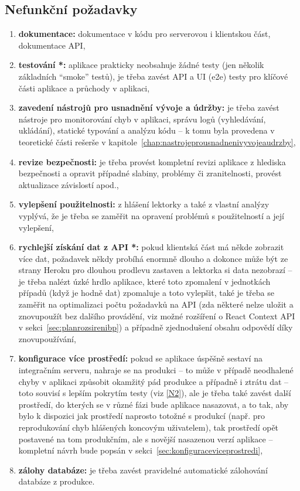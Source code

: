 \subsection{Nefunkční požadavky}

\begin{enumerate}[label=\textbf{N\arabic*}]
    \item \label{N1} \textbf{dokumentace:} dokumentace v kódu pro serverovou i klientskou část, dokumentace API,
    \item \label{N2} \textbf{testování *:} aplikace prakticky neobsahuje žádné testy (jen několik základních \enquote{smoke} testů), je třeba zavést API a UI (e2e) testy pro klíčové části aplikace a průchody v aplikaci,
    \item \label{N3} \textbf{zavedení nástrojů pro usnadnění vývoje a údržby:} je třeba zavést nástroje pro monitorování chyb v aplikaci, správu logů (vyhledávání, ukládání), statické typování a analýzu kódu -- k tomu byla provedena v teoretické části rešerše v kapitole~\ref{chap:nastrojeprousnadnenivyvojeaudrzby},
    \item \label{N4} \textbf{revize bezpečnosti:} je třeba provést kompletní revizi aplikace z hlediska bezpečnosti a opravit případné slabiny, problémy či zranitelnosti, provést aktualizace závislostí apod.,
    \item \label{N5} \textbf{vylepšení použitelnosti:} z hlášení lektorky a také z vlastní analýzy vyplývá, že je třeba se zaměřit na opravení problémů s použitelností a její vylepšení,
    \item \label{N6} \textbf{rychlejší získání dat z API *:} pokud klientská část má někde zobrazit více dat, požadavek někdy probíhá enormně dlouho a dokonce může být ze strany Heroku pro dlouhou prodlevu zastaven a lektorka si data nezobrazí -- je třeba nalézt úzké hrdlo aplikace, které toto zpomalení v jednotkách případů (když je hodně dat) zpomaluje a toto vylepšit, také je třeba se zaměřit na optimalizaci počtu požadavků na API (zda některé nelze uložit a znovupoužít bez dalšího provádění, viz možné rozšíření o React Context API v sekci~\ref{sec:planrozsirenibp}) a případně zjednodušení obsahu odpovědí díky znovupoužívání,
    \item \label{N7} \textbf{konfigurace více prostředí:} pokud se aplikace úspěšně sestaví na integračním serveru, nahraje se na produkci \cite{bp} -- to může v případě neodhalené chyby v aplikaci způsobit okamžitý pád produkce a případně i ztrátu dat -- toto souvisí s lepším pokrytím testy (viz \ref{N2}), ale je třeba také zavést další prostředí, do kterých se v různé fázi bude aplikace nasazovat, a to tak, aby bylo k dispozici jak prostředí naprosto totožné s produkcí (např. pro reprodukování chyb hlášených koncovým uživatelem), tak prostředí opět postavené na tom produkčním, ale s novější nasazenou verzí aplikace -- kompletní návrh bude popsán v sekci~\ref{sec:konfiguraceviceprostredi},
    \item \label{N8} \textbf{zálohy databáze:} je třeba zavést pravidelné automatické zálohování databáze z produkce.
\end{enumerate}

